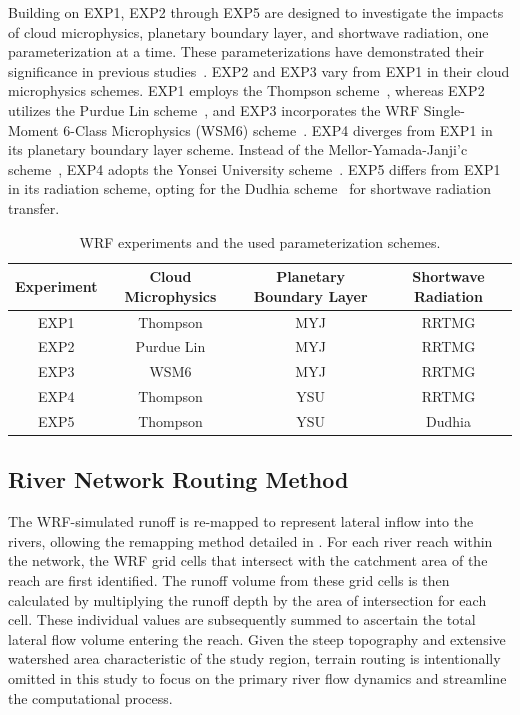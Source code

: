\documentclass[draft]{agujournal2019}
\begin{document}
Building on EXP1, EXP2 through EXP5 are designed to investigate the impacts of cloud microphysics, planetary boundary layer, and shortwave radiation, one parameterization at a time. These parameterizations have demonstrated their significance in previous studies~\cite{lv2020JGRA, prein2023CD}. EXP2 and EXP3 vary from EXP1 in their cloud microphysics schemes. EXP1 employs the Thompson scheme~\cite{thompson2008MWR}, whereas EXP2 utilizes the Purdue Lin scheme~\cite{chen2002JMSJ}, and EXP3 incorporates the WRF Single-Moment 6-Class Microphysics (WSM6) scheme~\cite{hong2006APJAS}. EXP4 diverges from EXP1 in its planetary boundary layer scheme. Instead of the Mellor-Yamada-Janji'c scheme~\cite{janjic1994MWR}, EXP4 adopts the Yonsei University scheme~\cite{hong2006MWR}. EXP5 differs from EXP1 in its radiation scheme, opting for the Dudhia scheme~\cite{dudhia1989JAS} for shortwave radiation transfer.

\begin{table}[h!]
  \doublerulesep 0.3pt
  \renewcommand{\arraystretch}{1}  %
  \caption{WRF experiments and the used parameterization schemes.}
  \label{tab:wrf_experiment}
  \vspace*{5mm}
  \begin{tabular*}{140mm}{cccc}
    \hline
    Experiment & Cloud Microphysics & Planetary Boundary Layer & Shortwave Radiation \\
    \hline
    EXP1 & Thompson & MYJ & RRTMG \\
    EXP2 & Purdue Lin & MYJ & RRTMG \\
    EXP3 & WSM6 & MYJ & RRTMG \\
    EXP4 & Thompson & YSU & RRTMG \\
    EXP5 & Thompson & YSU & Dudhia \\
    \hline
  \end{tabular*}
  \renewcommand{\arraystretch}{1}  %
\end{table}

\subsection{River Network Routing Method}
\label{sec:river}

The WRF-simulated runoff is re-mapped to represent lateral inflow into the rivers, ollowing the remapping method detailed in \cite{lin2018EMS, wang2019CSB}. For each river reach within the network, the WRF grid cells that intersect with the catchment area of the reach are first identified. The runoff volume from these grid cells is then calculated by multiplying the runoff depth by the area of intersection for each cell. These individual values are subsequently summed to ascertain the total lateral flow volume entering the reach. Given the steep topography and extensive watershed area characteristic of the study region, terrain routing is intentionally omitted in this study to focus on the primary river flow dynamics and streamline the computational process.
\end{document}
